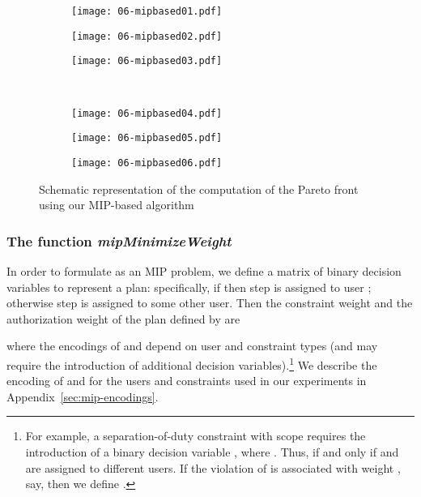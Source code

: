 \documentclass[jcs,crcready]{iosart1c}
\begin{document}
\begin{figure}[!htb]\centering

\begin{subfigure}[t]{.3\textwidth}
	\centering
		\texttt{[image: 06-mipbased01.pdf]}
        \caption{}
	\label{fig:mip1}
\end{subfigure}
\hfill
\begin{subfigure}[t]{.3\textwidth}
	\centering
	\texttt{[image: 06-mipbased02.pdf]}
	\caption{}
	\label{fig:mip2}
\end{subfigure}
\hfill
\begin{subfigure}[t]{.3\textwidth}
	\centering
		\texttt{[image: 06-mipbased03.pdf]}
	\caption{}
	\label{fig:mip3}
\end{subfigure}
\\
\begin{subfigure}[t]{.3\textwidth}
	\centering
		\texttt{[image: 06-mipbased04.pdf]}
	\caption{}
	\label{fig:mip4}
\end{subfigure}
\hfill
\begin{subfigure}[t]{.3\textwidth}
	\centering
	\texttt{[image: 06-mipbased05.pdf]}
	\caption{}
\end{subfigure}
\hfill
\begin{subfigure}[t]{.3\textwidth}
	\centering
		\texttt{[image: 06-mipbased06.pdf]}
	\caption{}
	\label{fig:mip6}
\end{subfigure}
\caption{
	Schematic representation of the computation of the Pareto front using our MIP-based algorithm}
\label{fig:mip-based}
\end{figure} 


\subsubsection{The function {\it mipMinimizeWeight}}\label{sec:mipMinimizeWeight}

 In order to formulate  as an MIP problem, we define a matrix of binary decision variables  to represent a plan: specifically, if  then step  is assigned to user ; otherwise step  is assigned to some other user.
 Then the constraint weight  and the authorization weight  of the plan defined by  are
 
 where the encodings of  and  depend on user and constraint types (and may require the introduction of additional decision variables).\footnote{For example, a separation-of-duty constraint  with scope  requires the introduction of a binary decision variable , where .
	    Thus,  if and only if  and  are assigned to different users.
	    If the violation of  is associated with weight , say, then we define .}
 We describe the encoding of  and  for the users and constraints used in our experiments in Appendix~\ref{sec:mip-encodings}.
 
\end{document}
